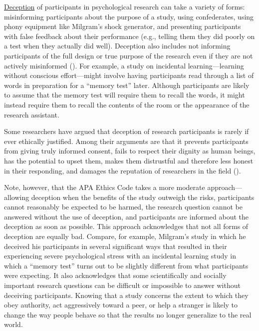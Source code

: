 \documentclass[
]{krantz}
\begin{document}
\hyperref[deception]{Deception} of participants in psychological research can take a variety of forms: misinforming participants about the purpose of a study, using confederates, using phony equipment like Milgram's shock generator, and presenting participants with false feedback about their performance (e.g., telling them they did poorly on a test when they actually did well). Deception also includes not informing participants of the full design or true purpose of the research even if they are not actively misinformed (). For example, a study on incidental learning---learning without conscious effort---might involve having participants read through a list of words in preparation for a ``memory test'' later. Although participants are likely to assume that the memory test will require them to recall the words, it might instead require them to recall the contents of the room or the appearance of the research assistant.

Some researchers have argued that deception of research participants is rarely if ever ethically justified. Among their arguments are that it prevents participants from giving truly informed consent, fails to respect their dignity as human beings, has the potential to upset them, makes them distrustful and therefore less honest in their responding, and damages the reputation of researchers in the field ().

Note, however, that the APA Ethics Code takes a more moderate approach---allowing deception when the benefits of the study outweigh the risks, participants cannot reasonably be expected to be harmed, the research question cannot be answered without the use of deception, and participants are informed about the deception as soon as possible. This approach acknowledges that not all forms of deception are equally bad. Compare, for example, Milgram's study in which he deceived his participants in several significant ways that resulted in their experiencing severe psychological stress with an incidental learning study in which a ``memory test'' turns out to be slightly different from what participants were expecting. It also acknowledges that some scientifically and socially important research questions can be difficult or impossible to answer without deceiving participants. Knowing that a study concerns the extent to which they obey authority, act aggressively toward a peer, or help a stranger is likely to change the way people behave so that the results no longer generalize to the real world.
\end{document}
